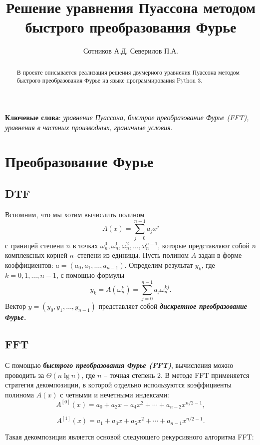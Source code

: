 \documentclass[a4paper,12pt]{article}
\author{Сотников А.Д, Северилов П.А.}
\title{Решение уравнения Пуассона методом быстрого преобразования Фурье}
\date{}
\theoremstyle{plain} %
\theoremstyle{definition} %
\theoremstyle{remark} %
\theoremstyle{definition}
\theoremstyle{definition}
\begin{document}
\maketitle

\begin{abstract}
	В проекте описывается реализация решения двумерного уравнения Пуассона методом быстрого преобразования Фурье на языке программирования Python 3.

\end{abstract}

\textbf{Ключевые слова}: \emph {уравнение Пуассона, быстрое преобразование Фурье (FFT), уравнения в частных производных, граничные условия}.

	\section{Преобразование Фурье}
	\subsection{DTF}
		Вспомним, что мы хотим вычислить полином
		$$A(x)=\sum_{j=0}^{n-1}a_{j}x^{j}$$
		с границей степени $n$ в точках $\omega_{n}^{0}, \omega_{n}^{1}, \omega_{n}^{2}, \dots, \omega_{n}^{n-1}$, которые представляют собой $n$ комплексных корней $n$--степени из единицы. Пусть полином $A$ задан в форме коэффициентов: $a=(a_{0}, a_{1},\dots, a_{n-1})$. Определим результат $y_{k}$, где $k=0,1,\dots,n-1$, с помощью формулы
		$$y_{k}=A(\omega_{n}^{k})=\sum_{j=0}^{n-1}a_{j}\omega_{n}^{kj}.$$
		Вектор $y=(y_{0}, y_{1}, \dots, y_{n-1})$ представляет собой \textrm{\textbf{\textit{дискретное преобразование Фурье.}}}
		\medskip
		
	\newpage
	\subsection{FFT}
		С помощью \textrm{\textbf{\textit{быстрого преобразования Фурье (FFT)}}}, вычисления можно проводить за $\Theta(n\lg n)$, где $n$ -- точная степень 2. В методе FFT применяется стратегия декомпозиции, в которой отдельно используются коэффициенты полинома $A(x)$ с четными и нечетными индексами:
		$$A^{[0]}(x)=a_{0}+a_{2}x+a_{4}x^{2}+\cdots+a_{n-2}x^{n/2-1},$$
		
		$$A^{[1]}(x)=a_{1}+a_{3}x+a_{5}x^{2}+\cdots+a_{n-1}x^{n/2-1}.$$
		
		Такая декомпозиция является основой следующего рекурсивного алгоритма FFT:
\end{document}
